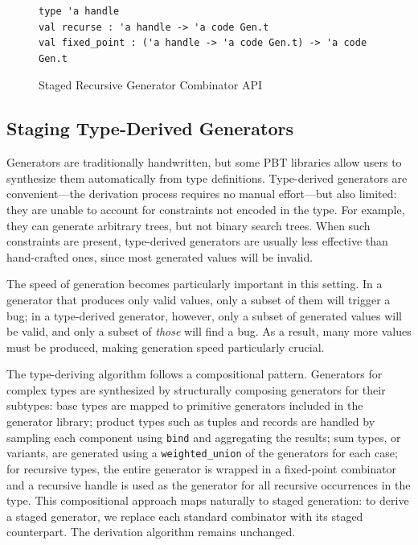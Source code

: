 \documentclass[acmsmall]{acmart}
\theoremstyle{definition}
\begin{document}
\begin{figure}[h]
\begin{lstlisting}
type 'a handle
val recurse : 'a handle -> 'a code Gen.t
val fixed_point : ('a handle -> 'a code Gen.t) -> 'a code Gen.t
\end{lstlisting}
\caption{Staged Recursive Generator Combinator API}
\label{fig:staged-recursive-generator}
\end{figure}


\subsection{Staging Type-Derived Generators}
\label{subsection:type-derived}

Generators are traditionally handwritten, but some PBT libraries allow users to synthesize
them automatically from type definitions. Type-derived generators are
convenient---the derivation process requires no manual effort---but also limited:
they are unable to account for constraints not encoded in the type. For example, they can
generate arbitrary trees, but not binary search trees. When such constraints are present,
type-derived generators are usually less effective than hand-crafted ones, since most
generated values will be invalid.

The speed of generation becomes particularly important in this setting. In a generator
that produces only valid values, only a subset of them will trigger a bug; in
a type-derived generator, however, only a subset of generated values will be valid,
and only a subset of \textit{those} will find a bug. As a result, many more values must be produced,
making generation speed particularly crucial.

The type-deriving algorithm follows a compositional pattern. Generators for complex types
are synthesized by structurally composing generators for their subtypes:
base types are mapped to primitive generators included in the generator library;
product types such as tuples and records are handled by sampling each component
using \texttt{bind} and aggregating the results; sum types, or variants, are generated using
a \texttt{weighted\_union} of the generators for each case; for recursive types,
the entire generator is wrapped in a fixed-point combinator and a recursive handle
is used as the generator for all recursive occurrences in the type.
This compositional approach maps naturally to staged generation:
to derive a staged generator, we replace each standard combinator
with its staged counterpart. The derivation algorithm remains unchanged.
\end{document}
